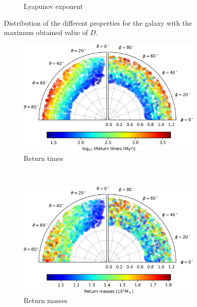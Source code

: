 \begin{figure}[h]
\begin{subfigure}[t]{0.6\textwidth}
			\caption{Lyapunov exponent}
			\label{fig: biggerD_lyapunov}
		\end{subfigure}
		\caption{Distribution of the different properties for the galaxy with the maximum obtained value of $D$.}
		\label{fig: biggerD}
	\end{figure}

	\begin{figure}[h]
		\centering
		\begin{subfigure}[t]{0.49\textwidth}
			\includegraphics[width = \textwidth]{"../Files/Week 13/biggerE_time"}
			\caption{Return times}
			\label{fig: biggerE_time}
		\end{subfigure}
		~ 
		\begin{subfigure}[t]{0.49\textwidth}
			\includegraphics[width=\textwidth]{"../Files/Week 13/biggerE_mass"}
			\caption{Return masses}
			\label{fig: biggerE_mass}
		\end{subfigure}
		\begin{subfigure}[t]{0.6\textwidth}

\end{subfigure}
\end{figure}
